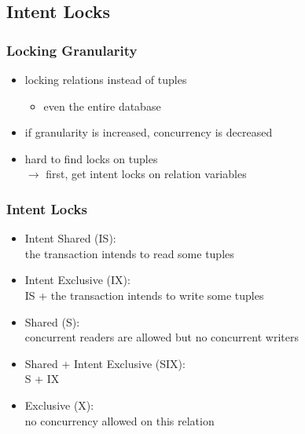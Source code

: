 \documentclass[dvipsnames]{beamer}
\theoremstyle{plain}
\begin{document}
\subsection{Intent Locks}

\begin{frame}
  \frametitle{Locking Granularity}

  \begin{itemize}
    \item locking relations instead of tuples
    \begin{itemize}
      \item even the entire database
    \end{itemize}

    \item if granularity is increased, concurrency is decreased

    \pause
    \item hard to find locks on tuples\\
      $\rightarrow$ first, get \alert{intent locks} on relation variables
  \end{itemize}
\end{frame}

\begin{frame}
  \frametitle{Intent Locks}

  \begin{itemize}
    \item Intent Shared (IS):\\
      the transaction intends to read some tuples

    \pause
    \item Intent Exclusive (IX):\\
      IS + the transaction intends to write some tuples

    \pause
    \item Shared (S):\\
      concurrent readers are allowed but no concurrent writers

    \pause
    \item Shared + Intent Exclusive (SIX):\\
      S + IX

    \pause
    \item Exclusive (X):\\
      no concurrency allowed on this relation
  \end{itemize}
\end{frame}
\end{document}
